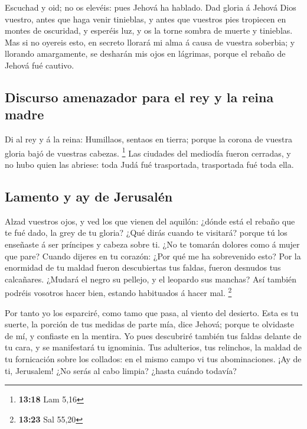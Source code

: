  Escuchad y oid; no os elevéis: pues Jehová ha hablado.
 Dad gloria á Jehová Dios vuestro, antes que haga venir
tinieblas, y antes que vuestros pies tropiecen en montes de oscuridad, y
esperéis luz, y os la torne sombra de muerte y tinieblas. 
Mas si no oyereis esto, en secreto llorará mi alma á causa de vuestra
soberbia; y llorando amargamente, se desharán mis ojos en lágrimas,
porque el rebaño de Jehová fué cautivo.

\hypertarget{discurso-amenazador-para-el-rey-y-la-reina-madre}{%
\subsection{Discurso amenazador para el rey y la reina
madre}\label{discurso-amenazador-para-el-rey-y-la-reina-madre}}

 Di al rey y á la reina: Humillaos, sentaos en tierra;
porque la corona de vuestra gloria bajó de vuestras cabezas. \footnote{\textbf{13:18}
  Lam 5,16}  Las ciudades del mediodía fueron cerradas, y
no hubo quien las abriese: toda Judá fué trasportada, trasportada fué
toda ella.

\hypertarget{lamento-y-ay-de-jerusaluxe9n}{%
\subsection{Lamento y ay de
Jerusalén}\label{lamento-y-ay-de-jerusaluxe9n}}

 Alzad vuestros ojos, y ved los que vienen del aquilón:
¿dónde está el rebaño que te fué dado, la grey de tu gloria?
 ¿Qué dirás cuando te visitará? porque tú los enseñaste á
ser príncipes y cabeza sobre ti. ¿No te tomarán dolores como á mujer que
pare?  Cuando dijeres en tu corazón: ¿Por qué me ha
sobrevenido esto? Por la enormidad de tu maldad fueron descubiertas tus
faldas, fueron desnudos tus calcañares.  ¿Mudará el negro
su pellejo, y el leopardo sus manchas? Así también podréis vosotros
hacer bien, estando habituados á hacer mal. \footnote{\textbf{13:23} Sal
  55,20}

 Por tanto yo los esparciré, como tamo que pasa, al viento
del desierto.  Esta es tu suerte, la porción de tus medidas
de parte mía, dice Jehová; porque te olvidaste de mí, y confiaste en la
mentira.  Yo pues descubriré también tus faldas delante de
tu cara, y se manifestará tu ignominia.  Tus adulterios,
tus relinchos, la maldad de tu fornicación sobre los collados: en el
mismo campo vi tus abominaciones. ¡Ay de ti, Jerusalem! ¿No serás al
cabo limpia? ¿hasta cuándo todavía?

